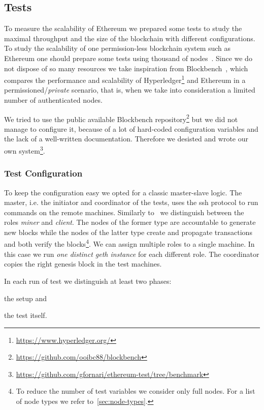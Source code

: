 \subsection{Tests}
\label{sec:tests}

To measure the scalability of Ethereum we prepared some tests to study the
maximal throughput and the size of the blockchain with different configurations.
To study the scalability of one permission-less blockchain system such as
Ethereum one should prepare some tests using thousand of
nodes~\cite{bib:securityAndScalabilityPoW, bib:algorand}. Since we do not
dispose of so many resources we take inspiration from
Blockbench~\cite{blockbench}, which compares the performance and scalability of
Hyperledger\footnote{\url{https://www.hyperledger.org/}} and Ethereum in a
permissioned/\emph{private} scenario, that is, when we take into consideration
a limited number of authenticated nodes.

We tried to use the public available Blockbench
repository\footnote{\url{https://github.com/ooibc88/blockbench}} but we did not
manage to configure it, because of a lot of hard-coded configuration variables
and the lack of a well-written documentation. Therefore we desisted and wrote
our own
system\footnote{\url{https://github.com/gfornari/ethereum-test/tree/benchmark}}.


\subsubsection{Test Configuration}

To keep the configuration easy we opted for a classic master-slave logic. The
master, i.e. the initiator and coordinator of the tests, uses the ssh protocol
to run commands on the remote machines. Similarly to~\cite{blockbench} we
distinguish between the roles \emph{miner} and \emph{client}. The nodes of the
former type are accountable to generate new blocks while the nodes of the latter
type create and propagate transactions and both verify the blocks\footnote{To
reduce the number of test variables we consider only full nodes. For a list of 
node types we refer to~\autoref{sec:node-types}.}. We can assign
multiple roles to a single machine. In this case we run \emph{one distinct geth
instance} for each different role. The coordinator copies the right genesis
block in the test machines.

In each run of test we distinguish at least two phases:
\begin{enumerate*}
  \item the setup and
  \item the test itself.
\end{enumerate*}

